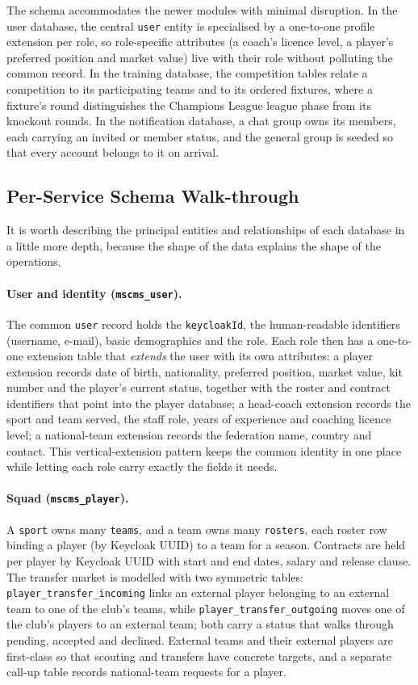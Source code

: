The schema accommodates the newer modules with minimal disruption. In the user
database, the central \texttt{user} entity is specialised by a one-to-one profile
extension per role, so role-specific attributes (a coach's licence level, a player's
preferred position and market value) live with their role without polluting the common
record. In the training database, the competition tables relate a competition to its
participating teams and to its ordered fixtures, where a fixture's round
distinguishes the Champions League league phase from its knockout rounds. In the
notification database, a chat group owns its members, each carrying an invited or
member status, and the general group is seeded so that every account belongs to it on
arrival.

\subsection{Per-Service Schema Walk-through}
\label{sec:schema-walkthrough}

It is worth describing the principal entities and relationships of each database in a
little more depth, because the shape of the data explains the shape of the operations.

\paragraph{User and identity (\texttt{mscms\_user}).} The common \texttt{user} record
holds the \texttt{keycloakId}, the human-readable identifiers (username, e-mail), basic
demographics and the role. Each role then has a one-to-one extension table that
\emph{extends} the user with its own attributes: a player extension records date of
birth, nationality, preferred position, market value, kit number and the player's
current status, together with the roster and contract identifiers that point into the
player database; a head-coach extension records the sport and team served, the staff
role, years of experience and coaching licence level; a national-team extension records
the federation name, country and contact. This vertical-extension pattern keeps the
common identity in one place while letting each role carry exactly the fields it needs.

\paragraph{Squad (\texttt{mscms\_player}).} A \texttt{sport} owns many \texttt{teams},
and a team owns many \texttt{rosters}, each roster row binding a player (by Keycloak
UUID) to a team for a season. Contracts are held per player by Keycloak UUID with start
and end dates, salary and release clause. The transfer market is modelled with two
symmetric tables: \texttt{player\_transfer\_incoming} links an external player belonging
to an external team to one of the club's teams, while \texttt{player\_transfer\_outgoing}
moves one of the club's players to an external team; both carry a status that walks
through pending, accepted and declined. External teams and their external players are
first-class so that scouting and transfers have concrete targets, and a separate
call-up table records national-team requests for a player.

